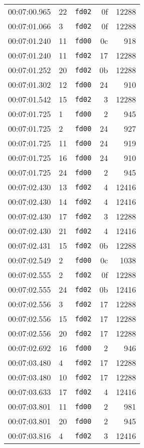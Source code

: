 \documentclass{article}
\begin{document}
\begin{longtable}{lllrr}
00:07:00.965 & 22 & \texttt{fd02} & 0f & 12288 \\
00:07:01.066 & 3 & \texttt{fd02} & 0f & 12288 \\
00:07:01.240 & 11 & \texttt{fd00} & 0c & 918 \\
00:07:01.240 & 11 & \texttt{fd02} & 17 & 12288 \\
00:07:01.252 & 20 & \texttt{fd02} & 0b & 12288 \\
00:07:01.302 & 12 & \texttt{fd00} & 24 & 910 \\
00:07:01.542 & 15 & \texttt{fd02} & 3 & 12288 \\
00:07:01.725 & 1 & \texttt{fd00} & 2 & 945 \\
00:07:01.725 & 2 & \texttt{fd00} & 24 & 927 \\
00:07:01.725 & 11 & \texttt{fd00} & 24 & 919 \\
00:07:01.725 & 16 & \texttt{fd00} & 24 & 910 \\
00:07:01.725 & 24 & \texttt{fd00} & 2 & 945 \\
00:07:02.430 & 13 & \texttt{fd02} & 4 & 12416 \\
00:07:02.430 & 14 & \texttt{fd02} & 4 & 12416 \\
00:07:02.430 & 17 & \texttt{fd02} & 3 & 12288 \\
00:07:02.430 & 21 & \texttt{fd02} & 4 & 12416 \\
00:07:02.431 & 15 & \texttt{fd02} & 0b & 12288 \\
00:07:02.549 & 2 & \texttt{fd00} & 0c & 1038 \\
00:07:02.555 & 2 & \texttt{fd02} & 0f & 12288 \\
00:07:02.555 & 24 & \texttt{fd02} & 0b & 12416 \\
00:07:02.556 & 3 & \texttt{fd02} & 17 & 12288 \\
00:07:02.556 & 15 & \texttt{fd02} & 17 & 12288 \\
00:07:02.556 & 20 & \texttt{fd02} & 17 & 12288 \\
00:07:02.692 & 16 & \texttt{fd00} & 2 & 946 \\
00:07:03.480 & 4 & \texttt{fd02} & 17 & 12288 \\
00:07:03.480 & 10 & \texttt{fd02} & 17 & 12288 \\
00:07:03.633 & 17 & \texttt{fd02} & 4 & 12416 \\
00:07:03.801 & 11 & \texttt{fd00} & 2 & 981 \\
00:07:03.801 & 20 & \texttt{fd00} & 2 & 945 \\
00:07:03.816 & 4 & \texttt{fd02} & 3 & 12416 \\

\end{longtable}
\end{document}
